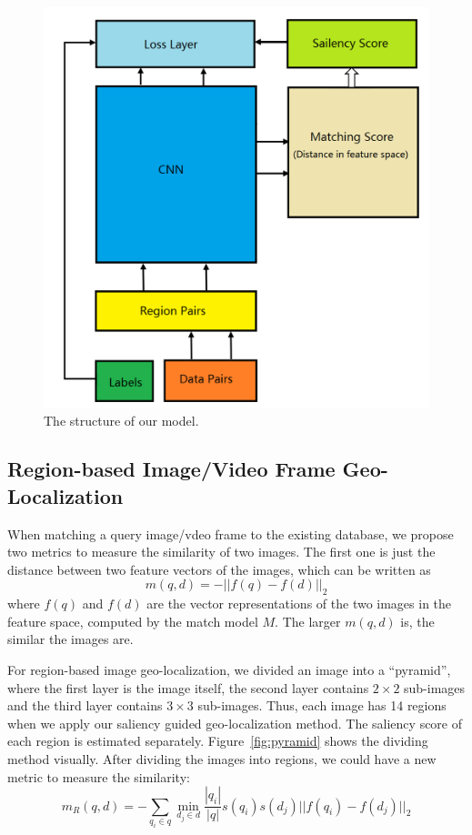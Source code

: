 \begin{figure}[htbp]
\includegraphics[width=0.9\linewidth]{img/structure}
\caption{The structure of our model.}
\label{fig:network}
\end{figure}

\subsection{Region-based Image/Video Frame Geo-Localization}
\par
When matching a query image/vdeo frame to the existing database, we propose two metrics to measure the similarity of two images. The first one is just the distance between two feature vectors of the images, which can be written as 
\begin{equation}
m(q, d) =  -||f(q) - f(d)||_2
\label{eq-6}
\end{equation}
where $f(q)$ and $f(d)$ are the vector representations of the two images in the feature space, computed by the match model $M$. The larger $m(q,d)$ is, the similar the images are. 
\par
For region-based image geo-localization, we divided an image into a ``pyramid'', where the first layer is the image itself, the second layer contains $2 \times 2$ sub-images and the third layer contains $3 \times 3$ sub-images. Thus, each image has 14 regions when we apply our saliency guided geo-localization method. The saliency score of each region is estimated separately. Figure~\ref{fig:pyramid} shows the dividing method visually. 
After dividing the images into regions, we could have a new metric to measure the similarity:
\begin{equation}
m_R(q,d) = -\sum_{q_i \in q} \min_{d_j\in d} \frac{|q_i|}{|q|} s(q_i)s(d_j) ||f(q_i)-f(d_j)||_2
\label{eq-7}
\end{equation}
 
